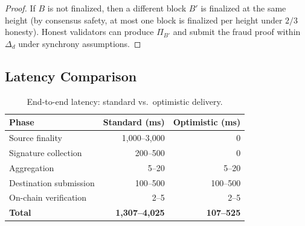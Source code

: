 \begin{proof}
If $B$ is not finalized, then a different block $B'$ is finalized at the same height (by consensus safety, at most one block is finalized per height under $2/3$ honesty). Honest validators can produce $\Pi_{B'}$ and submit the fraud proof within $\Delta_d$ under synchrony assumptions.
\end{proof}

\subsection{Latency Comparison}

\begin{table}[H]
\centering
\caption{End-to-end latency: standard vs.\ optimistic delivery.}
\label{tab:latency}
\begin{tabular}{lrr}
\toprule
\textbf{Phase} & \textbf{Standard (ms)} & \textbf{Optimistic (ms)} \\
\midrule
Source finality & 1{,}000--3{,}000 & 0 \\
Signature collection & 200--500 & 0 \\
Aggregation & 5--20 & 5--20 \\
Destination submission & 100--500 & 100--500 \\
On-chain verification & 2--5 & 2--5 \\
\midrule
\textbf{Total} & \textbf{1{,}307--4{,}025} & \textbf{107--525} \\
\bottomrule
\end{tabular}
\end{table}

